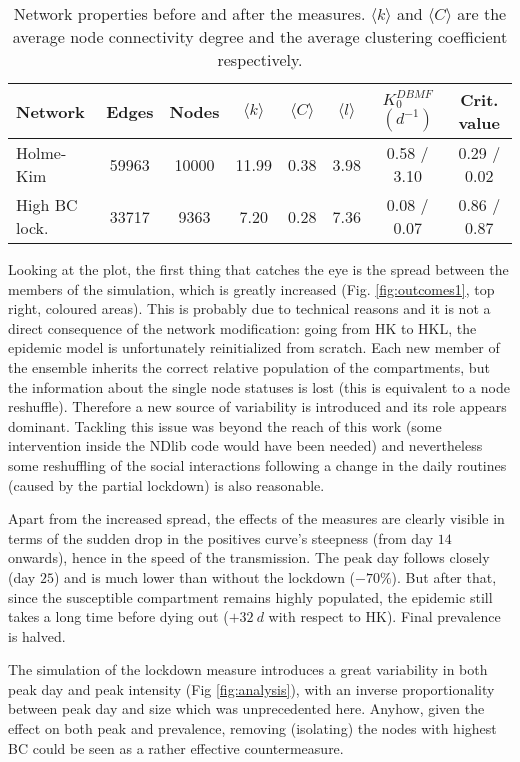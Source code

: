 \documentclass[DIV=12, BCOR=0pt]{scrartcl}  %
\begin{document}
	\begin{table}[h]
		\centering
		\caption{Network properties before and after the measures. $\langle k \rangle$ and $\langle C \rangle$ are the average node connectivity degree and the average clustering coefficient respectively.}
		\label{tab:lock_networks}
		\begin{tabular}{lccccccc}
			\toprule
			Network &  Edges &  Nodes & $\langle k \rangle$ & $\langle C \rangle$ & $\langle l \rangle$ & $K_0^{DBMF}$ $(d^{-1})$ & Crit. value \\
			\midrule
			Holme-Kim 		&  59963 &  10000 & 11.99 &  0.38 &  3.98 &  0.58 / 3.10 &   0.29 / 0.02 \\ 
			High BC lock.	&  33717 &   9363 &  7.20 &  0.28 &  7.36 &  0.08 / 0.07 &   0.86 / 0.87 \\
			
			\bottomrule
		\end{tabular}
	\end{table}
	
	Looking at the plot, the first thing that catches the eye is the spread between the members of the simulation, which is greatly increased (Fig. \ref{fig:outcomes1}, top right, coloured areas). This is probably due to technical reasons and it is not a direct consequence of the network modification: going from HK to HKL, the epidemic model is unfortunately reinitialized from scratch. Each new member of the ensemble inherits the correct relative population of the compartments, but the information about the single node statuses is lost (this is equivalent to a node reshuffle). Therefore a new source of variability is introduced and its role appears dominant. Tackling this issue was beyond the reach of this work (some intervention inside the NDlib code would have been needed) and nevertheless some reshuffling of the social interactions following a change in the daily routines (caused by the partial lockdown) is also reasonable.
	
	Apart from the increased spread, the effects of the measures are clearly visible in terms of the sudden drop in the positives curve's steepness (from day $14$ onwards), hence in the speed of the transmission. The peak day follows closely (day $25$) and is much lower than without the lockdown ($- 70 \%$). But after that, since the susceptible compartment remains highly populated, the epidemic still takes a long time before dying out ($+ 32 \ d$ with respect to HK). Final prevalence is halved.
	
	The simulation of the lockdown measure introduces a great variability in both peak day and peak intensity (Fig \ref{fig:analysis}), with an inverse proportionality between peak day and size	which was unprecedented here.
	Anyhow, given the effect on both peak and prevalence, removing (isolating) the nodes with highest BC could be seen as a rather effective countermeasure.
 	
\end{document}
